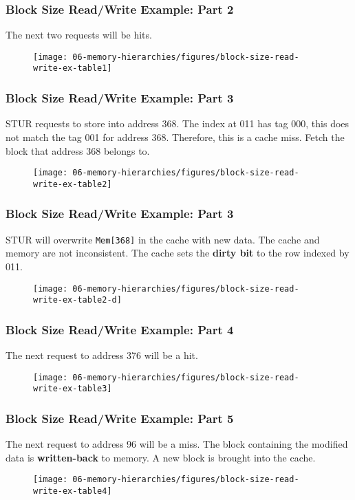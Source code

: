 {%
\begin{frame}\frametitle{Block Size Read/Write Example: Part 2}
The next two requests will be hits.
\begin{figure}[H]
\centering
{\texttt{[image: 06-memory-hierarchies/figures/block-size-read-write-ex-table1]}}
\end{figure}
\end{frame}
\newpage
\begin{frame}\frametitle{Block Size Read/Write Example: Part 3}
STUR requests to store into address 368. The index at 011 has tag 000, this does not match the tag 001 for address 368. Therefore, this is a cache miss. Fetch the block that address 368 belongs to.
\begin{figure}[H]
\centering
{\texttt{[image: 06-memory-hierarchies/figures/block-size-read-write-ex-table2]}}
\end{figure}
\end{frame}
\newpage
\begin{frame}\frametitle{Block Size Read/Write Example: Part 3}
STUR will overwrite \texttt{Mem[368]} in the cache with new data. The cache and memory are not inconsistent. The cache sets the \textbf{dirty bit} to the row indexed by 011.
\begin{figure}[H]
\centering
{\texttt{[image: 06-memory-hierarchies/figures/block-size-read-write-ex-table2-d]}}
\end{figure}
\end{frame}
\begin{frame}\frametitle{Block Size Read/Write Example: Part 4}
The next request to address 376 will be a hit.
\begin{figure}[H]
\centering
{\texttt{[image: 06-memory-hierarchies/figures/block-size-read-write-ex-table3]}}
\end{figure}
\end{frame}

\begin{frame}\frametitle{Block Size Read/Write Example: Part 5}
The next request to address 96 will be a miss. The block containing the modified data is \textbf{written-back} to memory. A new block is brought into the cache.
\begin{figure}[H]
\centering
{\texttt{[image: 06-memory-hierarchies/figures/block-size-read-write-ex-table4]}}
\end{figure}
\end{frame}
}\fi

